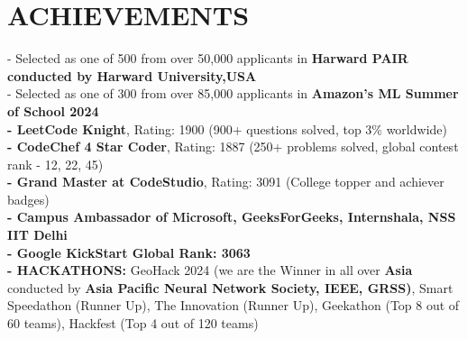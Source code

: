 \documentclass[letterpaper,11pt]{article}
\begin{document}
\section{\textbf{ACHIEVEMENTS}}
\begin{itemize}[leftmargin=0.15in, label={}]
    \small{\item{
    - Selected as one of 500 from over 50,000 applicants in \textbf{Harward PAIR conducted by Harward University,USA} \\
    - Selected as one of 300 from over 85,000 applicants in \textbf{Amazon's ML Summer of School 2024} \\
    \textbf{- LeetCode Knight}, Rating: 1900 (900+ questions solved, top 3\% worldwide) \\
    \textbf{- CodeChef 4 Star Coder}, Rating: 1887 (250+ problems solved, global contest rank - 12, 22, 45) \\
    \textbf{- Grand Master at CodeStudio}, Rating: 3091 (College topper and achiever badges) \\
    \textbf{- Campus Ambassador of Microsoft, GeeksForGeeks, Internshala, NSS IIT Delhi} \\
    \textbf{- Google KickStart Global Rank: 3063} \\
    \textbf{- HACKATHONS:} GeoHack 2024 (we are the Winner in all over \textbf{Asia} conducted by \textbf{Asia Pacific Neural Network Society, IEEE, GRSS)}, Smart Speedathon (Runner Up), The Innovation (Runner Up), Geekathon (Top 8 out of 60 teams), Hackfest (Top 4 out of 120 teams)} \\
    }
\end{itemize}
\end{document}
